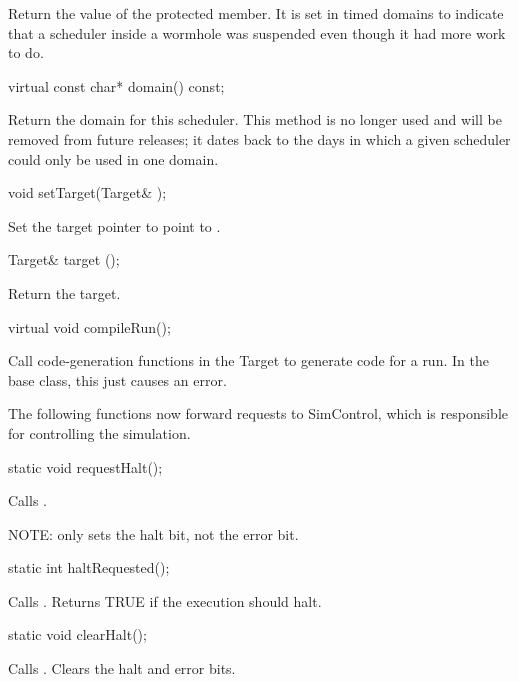 Return the value of the  protected member.
It is set in timed domains to indicate that a scheduler inside a
wormhole was suspended even though it had more work to do.

\begin{example}
virtual const char* domain() const;
\end{example}

Return the domain for this scheduler.  This method is no longer used and
will be removed from future releases; it dates back to the days
in which a given scheduler could only be used in one domain.

\begin{example}
void setTarget(Target& );
\end{example}

Set the target pointer to point to .

\begin{example}
Target& target ();
\end{example}

Return the target.

\begin{example}
virtual void compileRun();
\end{example}

Call code-generation functions in the Target to generate
code for a run.
In the base class, this just causes an error.

The following functions now forward requests to SimControl,
which is responsible for controlling the simulation.

\begin{example}
static void requestHalt();
\end{example}

Calls .

NOTE:  only sets the halt bit,
not the error bit.

\begin{example}
static int haltRequested();
\end{example}

Calls .  Returns TRUE if the
execution should halt.

\begin{example}
static void clearHalt();
\end{example}

Calls .  Clears the halt and error
bits.

